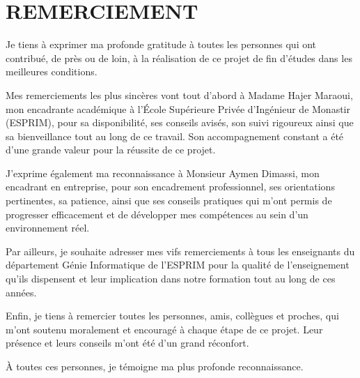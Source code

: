 \chapter*{REMERCIEMENT}
\thispagestyle{MyStyle}

\noindent Je tiens à exprimer ma profonde gratitude à toutes les personnes qui ont contribué, de près ou de loin, à la réalisation de ce projet de fin d'études dans les meilleures conditions.

 Mes remerciements les plus sincères vont tout d’abord à Madame Hajer Maraoui, mon encadrante académique à l’École Supérieure Privée d’Ingénieur de Monastir (ESPRIM), pour sa disponibilité, ses conseils avisés, son suivi rigoureux ainsi que sa bienveillance tout au long de ce travail. Son accompagnement constant a été d'une grande valeur pour la réussite de ce projet.

 J’exprime également ma reconnaissance à Monsieur Aymen Dimassi, mon encadrant en entreprise, pour son encadrement professionnel, ses orientations pertinentes, sa patience, ainsi que ses conseils pratiques qui m’ont permis de progresser efficacement et de développer mes compétences au sein d’un environnement réel.

 Par ailleurs, je souhaite adresser mes vifs remerciements à tous les enseignants du département Génie Informatique de l’ESPRIM pour la qualité de l’enseignement qu’ils dispensent et leur implication dans notre formation tout au long de ces années.

 Enfin, je tiens à remercier toutes les personnes, amis, collègues et proches, qui m’ont soutenu moralement et encouragé à chaque étape de ce projet. Leur présence et leurs conseils m’ont été d’un grand réconfort.
 
 À toutes ces personnes, je témoigne ma plus profonde reconnaissance.
